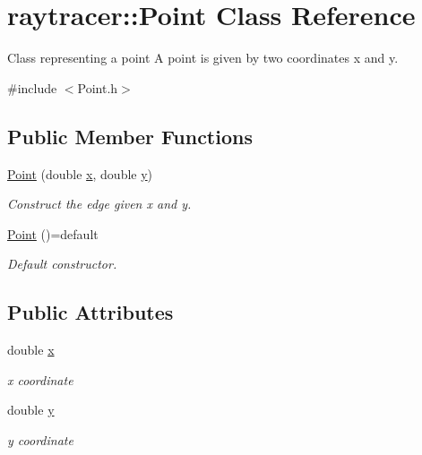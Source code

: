 \hypertarget{classraytracer_1_1Point}{}\section{raytracer\+:\+:Point Class Reference}
\label{classraytracer_1_1Point}


Class representing a point A point is given by two coordinates x and y.  




{\ttfamily \#include $<$Point.\+h$>$}

\subsection*{Public Member Functions}
\begin{DoxyCompactItemize}
\item 
\hyperlink{classraytracer_1_1Point_a83811a7a3dde9274ec54594382022881}{Point} (double \hyperlink{classraytracer_1_1Point_a8cd46ef6a7b34bb14b15ab32a0b06765}{x}, double \hyperlink{classraytracer_1_1Point_ac64ea4155918cebcb801ccfa9daf29aa}{y})
\begin{DoxyCompactList}\small\item\em Construct the edge given x and y. \end{DoxyCompactList}\item 
\hyperlink{classraytracer_1_1Point_a32f294cfdddaea0eade54bf7d075fa3a}{Point} ()=default
\begin{DoxyCompactList}\small\item\em Default constructor. \end{DoxyCompactList}\end{DoxyCompactItemize}
\subsection*{Public Attributes}
\begin{DoxyCompactItemize}
\item 
\mbox{\label{classraytracer_1_1Point_a8cd46ef6a7b34bb14b15ab32a0b06765}} 
double \hyperlink{classraytracer_1_1Point_a8cd46ef6a7b34bb14b15ab32a0b06765}{x}
\begin{DoxyCompactList}\small\item\em x coordinate \end{DoxyCompactList}\item 
\mbox{\label{classraytracer_1_1Point_ac64ea4155918cebcb801ccfa9daf29aa}} 
double \hyperlink{classraytracer_1_1Point_ac64ea4155918cebcb801ccfa9daf29aa}{y}
\begin{DoxyCompactList}\small\item\em y coordinate \end{DoxyCompactList}\end{DoxyCompactItemize}


